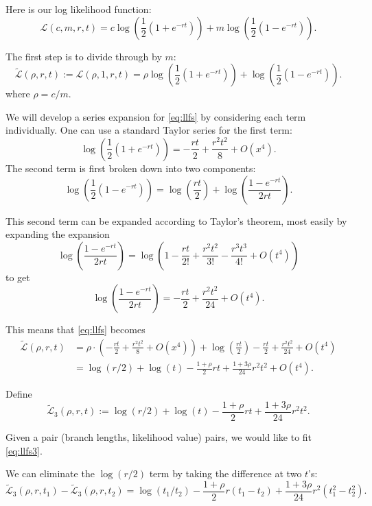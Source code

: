 \documentclass{amsart}
\newcommand{\llf}{\mathcal{L}}
\newcommand{\llfs}{\tilde{\llf}}
\begin{document}
Here is our log likelihood function:
\[
  \llf(c,m,r,t) = c \log\left(\frac{1}{2}(1+e^{-rt})\right) + m \log\left(\frac{1}{2}(1-e^{-rt})\right).
\]

The first step is to divide through by $m$:
\begin{equation}
  \llfs(\rho,r,t) := \llf(\rho,1,r,t) = \rho \log \left(\frac{1}{2}(1+e^{-rt})\right) + \log \left(\frac{1}{2}(1-e^{-rt})\right).
  \label{eq:llfs}
\end{equation}
where $\rho = c/m$.

We will develop a series expansion for \eqref{eq:llfs} by considering each term individually.
One can use a standard Taylor series for the first term:
\begin{equation}
  \log \left(\frac{1}{2}(1+e^{-rt})\right) = - \frac{rt}{2} + \frac{r^2 t^2}{8} + O(x^4).
\end{equation}
The second term is first broken down into two components:
\begin{equation}
  \log \left(\frac{1}{2}(1-e^{-rt})\right) = \log \left(\frac{rt}{2} \right) + \log \left(\frac{1-e^{-rt}}{2 rt}\right).
\end{equation}

This second term can be expanded according to Taylor's theorem, most easily by expanding the expansion
\[
  \log \left(\frac{1-e^{-rt}}{2 rt}\right) = \log \left(1 - \frac{rt}{2!} + \frac{r^2 t^2}{3!} - \frac{r^3 t^3}{4!} + O(t^4) \right)
\]
to get
\[
  \log \left(\frac{1-e^{-rt}}{2 rt}\right) = - \frac{rt}{2} + \frac{r^2 t^2}{24} + O(t^4).
\]

This means that \eqref{eq:llfs} becomes
\[
  \begin{split}
    \llfs(\rho,r,t) & = \rho \cdot \left(-\frac{rt}{2} + \frac{r^2 t^2}{8} + O(x^4) \right) + \log \left(\frac{rt}{2} \right) - \frac{rt}{2} + \frac{r^2 t^2}{24} + O(t^4)\\
    & = \log(r/2) + \log(t) - \frac{1+\rho}{2} r t + \frac{1+3 \rho}{24} r^2 t^2 + O(t^4).
  \end{split}
\]

Define
\begin{equation}
  \llfs_3(\rho,r,t) := \log(r/2) + \log(t) - \frac{1+\rho}{2} r t + \frac{1+3 \rho}{24} r^2 t^2.
  \label{eq:llfs3}
\end{equation}

Given a pair (branch lengths, likelihood value) pairs, we would like to fit \eqref{eq:llfs3}.

We can eliminate the $\log(r/2)$ term by taking the difference at two $t$'s:
\[
  \llfs_3(\rho,r,t_1) - \llfs_3(\rho,r,t_2) = \log(t_1/t_2) - \frac{1+\rho}{2} r (t_1 - t_2) + \frac{1+3 \rho}{24} r^2 (t_1^2 - t_2^2).
\]
\end{document}
